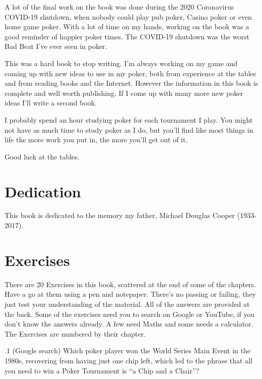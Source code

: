 A lot of the final work on the book was done during the 2020
Coronavirus COVID-19 shutdown, when nobody could play pub poker,
Casino poker or even home game poker. With a lot of time on my hands,
working on the book was a good reminder of happier poker times. The
COVID-19 shutdown was the worst Bad Beat I've ever seen in poker.

This was a hard book to stop writing. I'm always working on my game
and coming up with new ideas to use in my poker, both from experience
at the tables and from reading books and the Internet. However the
information in this book is complete and well worth
publishing. If I come up with many more new poker ideas I'll write
a second book.

I probably spend an hour studying poker for each tournament I play.
You might not have as much time to study poker as I do, but you'll
find like most things in life the more work you put in, the
more you'll get out of it.

Good luck at the tables.

\section*{Dedication}

This book is dedicated to the memory my father,
Michael Douglas Cooper (1933-2017).

\section{Exercises}


There are 20 Exercises in this book, scattered at the end of some of
the chapters. Have a go at them using a pen and notepaper. There's no
passing or failing, they just test your understanding of the
material. All of the answers are provided at the back. Some of the
exercises need you to search on Google or YouTube, if you don't know
the answers already. A few need Maths and some needs a calculator. The
Exercises are numbered by their chapter.

.1 (Google search) Which poker player won the World
Series Main Event in the 1980s, recovering from having just one chip
left, which led to the phrase that all you need to win a Poker
Tournament is ``a Chip and a Chair''?






